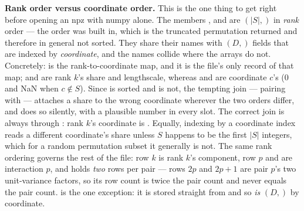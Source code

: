 \textbf{Rank order versus coordinate order.} This is the one thing to get right
before opening an npz with numpy alone. The members ,
 and  are $(|S|,)$ in \emph{rank} order --- the order
 was built in, which is the truncated permutation
 returned and therefore in general not sorted. They
share their names with $(D,)$  fields that are indexed by
\emph{coordinate}, and the
names collide where the arrays do not. Concretely:  is
the rank-to-coordinate map, and it is the file's only record of that map;
 and  are rank $k$'s share and
lengthscale, whereas  and  are
coordinate $c$'s ($0$ and NaN when $c\notin S$). Since  is
sorted and  is not, the tempting join --- pairing
 with  --- attaches a share to the
wrong coordinate wherever the two orders differ, and does so silently, with a
plausible number in every slot. The correct join is always through
: rank $k$'s coordinate is .
Equally, indexing  by a coordinate index reads a different
coordinate's share unless $S$ happens to be the first $|S|$ integers, which for
a random permutation subset it generally is not. The same rank ordering governs
the rest of the file:  row $k$ is rank $k$'s component,
 row $p$ and  are interaction $p$, and
 holds \emph{two} rows per pair --- rows $2p$ and $2p+1$
are pair $p$'s two unit-variance factors, so its row count is twice the pair
count and never equals the pair count.  is the one exception:
it is stored straight from  and so \emph{is} $(D,)$ by
coordinate.

